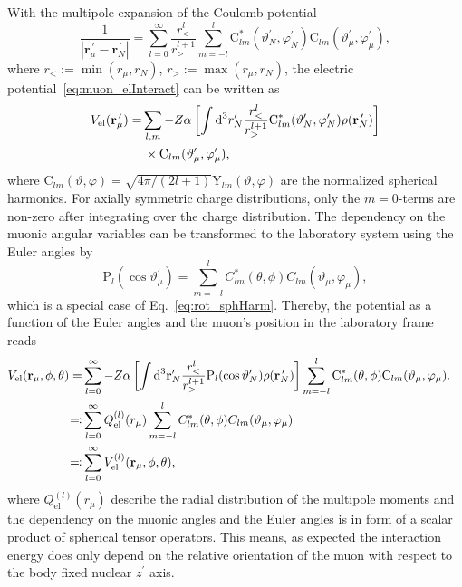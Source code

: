 With the multipole expansion of the Coulomb potential~\cite{jackson1999}
\begin{equation}
\frac{1}{|\mathbf{r}_\mu^{\,\prime}-\mathbf{r}_N^{\,\prime}|}=\sum_{l=0}^\infty \frac{r_<^l}{r_>^{l+1}}\sum_{m=-l}^l  \text{C}^*_{lm}(\vartheta_N^{\prime},\varphi_N^{\prime})\text{C}_{lm}(\vartheta_\mu^\prime,\varphi_\mu^\prime),
\end{equation}
where $r_<:=\min (r_\mu,r_N)$, $r_>:=\max (r_\mu,r_N)$, the electric potential~\eqref{eq:muon_elInteract} can be written as
\begin{align}
V_{\text{el}}(\mathbf{r}_\mu^{\,\prime})=&\sum_{l,m}-Z\alpha \left[ \int \text{d}^3r^{\prime}_N \frac{r_<^l}{r_>^{l+1}}\text{C}^*_{lm}(\vartheta_N^{\prime},\varphi_N^{\prime})\rho(\mathbf{r}_N^{\,\prime})\right]\notag\\
&\,\times\text{C}_{lm}(\vartheta_\mu^{\prime},\varphi_\mu^\prime),
\end{align}
where ${\text{C}_{lm}(\vartheta,\varphi)}{=}{\sqrt{4\pi/(2l+1)}\text{Y}_{lm}(\vartheta,\varphi)}$ are the normalized spherical harmonics.
For axially symmetric charge distributions, only the ${m}{=}{0}$-terms are non-zero after integrating over the charge distribution. The dependency on the muonic angular variables can be transformed to the laboratory system using the Euler angles by
\begin{equation}
\text{P}_{l}(\cos\vartheta_\mu^\prime)=
 \sum_{m=-l}^l C^*_{lm}(\theta,\phi)C_{lm}(\vartheta_\mu,\varphi_\mu),
\end{equation}
which is a special case of Eq.~\eqref{eq:rot_sphHarm}.
Thereby, the potential as a function of the Euler angles and the muon's position in the laboratory frame reads
\begin{align}
V_{\text{el}}(\mathbf{r}_\mu,\phi,\theta)=&\sum_{l=0}^\infty-Z\alpha \left[ \int \text{d}^3\mathbf{r}^{\prime}_N \frac{r_<^l}{r_>^{l+1}}\text{P}_{l}(\cos \vartheta_N^{\prime})\rho(\mathbf{r}_N^{\,\prime})\right]\sum_{m=-l}^l \text{C}^*_{lm}(\theta,\phi)\text{C}_{lm}(\vartheta_\mu,\varphi_\mu).\notag\\
\eqqcolon &\sum_{l=0}^\infty Q_{\text{el}}^{(l)}(r_\mu)\sum_{m=-l}^lC^*_{lm}(\theta,\phi)C_{lm}(\vartheta_\mu,\varphi_\mu)&\notag\\
\eqqcolon& \sum_{l=0}^\infty V^{(l)}_{\text{el}}(\mathbf{r}_\mu,\phi,\theta),
\label{eq:defmulti}
\end{align}
where $Q_{\text{el}}^{(l)}(r_\mu)$ describe the radial distribution of the multipole moments and the dependency on the muonic angles and the Euler angles is in form of a scalar product of spherical tensor operators. This means, as expected the interaction energy does only depend on the relative orientation of the muon with respect to the body fixed nuclear $z^\prime$ axis.


